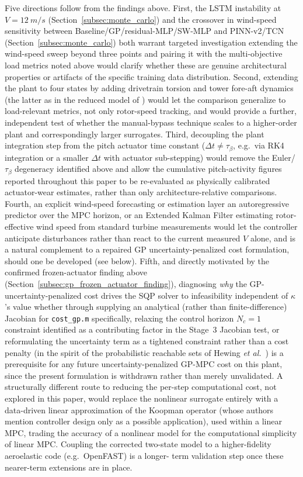 Five directions follow from the findings above. First, the LSTM
instability at $V=\SI{12}{m/s}$ (Section~\ref{subsec:monte_carlo}) and
the crossover in wind-speed sensitivity between
Baseline/GP/residual-MLP/SW-MLP and PINN-v2/TCN
(Section~\ref{subsec:monte_carlo}) both warrant targeted investigation
 extending the wind-speed sweep beyond three points and pairing it
with the multi-objective load metrics noted above would clarify whether
these are genuine architectural properties or artifacts of the specific
training data distribution. {\color{auditP2}Second, extending the plant to four states
by adding drivetrain torsion and tower fore-aft dynamics (the latter as
in the reduced model of \cite{schlipf2013})} would let the comparison generalize to
load-relevant metrics, not only rotor-speed tracking, and would provide
a further, independent test of whether the manual-bypass technique
scales to a higher-order plant and correspondingly larger surrogates.
Third, decoupling the plant integration step from the pitch actuator
time constant ($\Delta t \ne \tau_\beta$, e.g.\ via RK4 integration or
a smaller $\Delta t$ with actuator sub-stepping) would remove the
Euler/$\tau_\beta$ degeneracy identified above and allow the cumulative
pitch-activity figures reported throughout this paper to be
re-evaluated as physically calibrated actuator-wear estimates, rather
than only architecture-relative comparisons. Fourth, an explicit
wind-speed forecasting or estimation layer an
autoregressive predictor over the MPC horizon, or an Extended Kalman
Filter estimating rotor-effective wind speed from standard turbine
measurements \cite{soltani2013} would let the controller anticipate
disturbances rather than react to the current measured $V$ alone, and
is a natural complement to a repaired GP uncertainty-penalized cost
formulation, should one be developed (see below).
Fifth, and directly motivated
by the confirmed frozen-actuator finding above
(Section~\ref{subsec:gp_frozen_actuator_finding}), diagnosing
\emph{why} the GP-uncertainty-penalized cost drives the SQP solver to
infeasibility independent of $\kappa$'s value whether through
supplying an analytical (rather than finite-difference) Jacobian for
\texttt{cost\_gp.m} specifically, relaxing the control horizon
$N_c=1$ constraint identified as a contributing factor in the Stage~3
Jacobian test, or reformulating the uncertainty term as a tightened
constraint rather than a cost penalty (in the spirit of
the probabilistic reachable sets of Hewing \emph{et al.}~\cite{hewing2020}) is a prerequisite
for any future uncertainty-penalized GP-MPC cost on this plant, since
the present formulation is withdrawn rather than merely unvalidated.
{\color{auditP2}A structurally different route to reducing the per-step
computational cost, not explored in this paper, would replace the
nonlinear surrogate entirely with a data-driven linear approximation of the Koopman operator \cite{williams2015} (whose authors mention controller design only as a possible application), used within a linear MPC, trading the accuracy of a
nonlinear model for the computational simplicity of linear MPC.}
Coupling the corrected two-state
model to a higher-fidelity aeroelastic code (e.g.\ OpenFAST) is a longer-
term validation step once these nearer-term extensions are in place.

